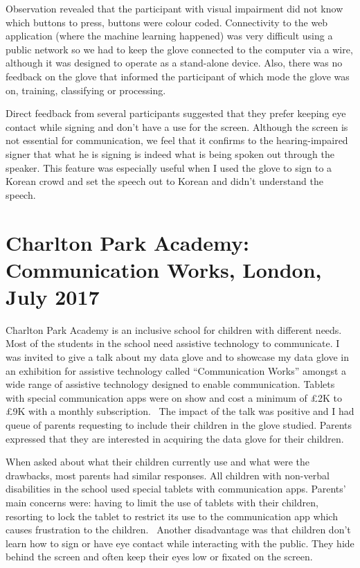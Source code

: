 Observation revealed that the participant with visual impairment did not know which buttons to press, buttons were colour coded. Connectivity to the web application (where the machine learning happened) was very difficult using a public network so we had to keep the glove connected to the computer via a wire, although it was designed to operate as a stand-alone device. Also, there was no feedback on the glove that informed the participant of which mode the glove was on, training, classifying or processing.

Direct feedback from several participants suggested that they prefer keeping eye contact while signing and don't have a use for the screen. Although the screen is not essential for communication, we feel that it confirms to the hearing-impaired signer that what he is signing is indeed what is being spoken out through the speaker. This feature was especially useful when I used the glove to sign to a Korean crowd and set the speech out to Korean and didn't understand the speech. 

\section{Charlton Park Academy: Communication Works, London, July 2017}

Charlton Park Academy is an inclusive school for children with different needs. Most of the students in the school need assistive technology to communicate. I was invited to give a talk about my data glove and to showcase my data glove in an exhibition for assistive technology called ``Communication Works'' amongst a wide range of assistive technology designed to enable communication. Tablets with special communication apps were on show and cost a minimum of £2K to £9K with a monthly subscription.  The impact of the talk was positive and I had queue of parents requesting to include their children in the glove studied. Parents expressed that they are interested in acquiring the data glove for their children. 

When asked about what their children currently use and what were the drawbacks, most parents had similar responses.  All children with non-verbal disabilities in the school used special tablets with communication apps. Parents' main concerns were: having to limit the use of tablets with their children, resorting to lock the tablet to restrict its use to the communication app which causes frustration to the children.  Another disadvantage was that children don't learn how to sign or have eye contact while interacting with the public. They hide behind the screen and often keep their eyes low or fixated on the screen. 

